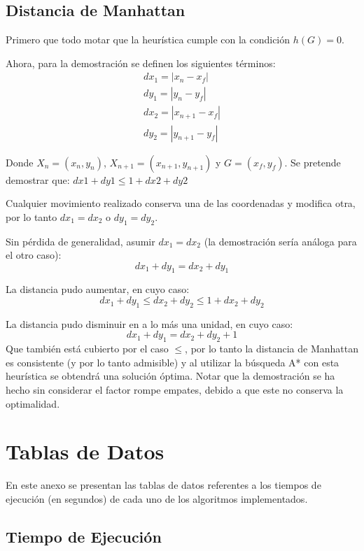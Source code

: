 \documentclass[letter, titlepage, 10pt]{article}
\newcommand{\abs}[1]{\left\vert#1\right\vert}
\begin{document}
\begin{appendices}
\subsection{Distancia de Manhattan}
Primero que todo motar que la heurística cumple con la condición $h(G) = 0$.

Ahora, para la demostración se definen los siguientes términos:
\begin{align*}
    dx_1 = \abs{x_n-x_f}\\
  dy_1 = \abs{y_n-y_f}\\
  dx_2 = \abs{x_{n+1}-x_f}\\
  dy_2 = \abs{y_{n+1}-y_f}
\end{align*}

Donde $X_n = (x_n,y_n)$, $X_{n+1} = (x_{n+1},y_{n+1})$ y $G = (x_f,y_f)$. 
Se pretende demostrar que: $dx1 + dy1 \leq 1 + dx2 + dy2$

Cualquier movimiento realizado conserva una de las coordenadas y modifica otra, por lo tanto $dx_1 = dx_2$ o $dy_1 = dy_2$.

Sin pérdida de generalidad, asumir $dx_1 = dx_2$ (la demostración sería análoga para el otro caso):
\begin{displaymath}
  dx_1 + dy_1 = dx_2 + dy_1
\end{displaymath}

La distancia pudo aumentar, en cuyo caso:
\begin{displaymath}
dx_1 + dy_1 \leq dx_2 + dy_2 \leq 1 + dx_2 + dy_2
\end{displaymath}

La distancia pudo disminuir en a lo más una unidad, en cuyo caso:
\begin{displaymath}
dx_1 +dy_1 = dx_2 + dy_2 + 1
\end{displaymath}
Que también está cubierto por el caso $\leq$, por lo tanto la distancia de Manhattan es consistente (y por lo tanto admisible) y al utilizar la búsqueda A* con esta heurística se obtendrá una solución óptima. Notar que la demostración se ha hecho sin considerar el factor rompe empates, debido a que este no conserva la optimalidad.

\newpage
  \section{Tablas de Datos}
  En este anexo se presentan las tablas de datos referentes a los tiempos de ejecución (en segundos) %
  de cada uno de los algoritmos implementados.
  \subsection{Tiempo de Ejecución}


\end{appendices}
\end{document}
